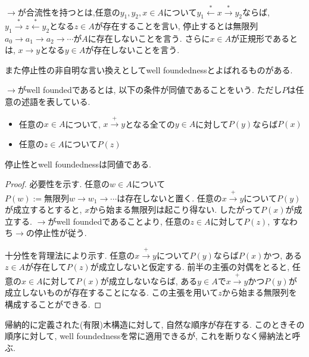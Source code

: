 \documentclass[12pt, titlepage]{ltjsarticle}
\begin{document}
\begin{defn}
$\rightarrow$が合流性を持つとは,任意の$y_{1},y_{2},x \in A$について$y_1 \overset{*}{\leftarrow} x \overset{*}{\rightarrow} y_2$ならば, $y_1 \overset{*}{\rightarrow} z \overset{*}{\leftarrow} y_2$となる$z \in A$が存在することを言い, 停止するとは無限列$a_0 \rightarrow a_1 \rightarrow a_2 \rightarrow \cdots$が$A$に存在しないことを言う. さらに$x \in A$が正規形であるとは, $x \rightarrow y$となる$y \in A$が存在しないことを言う.
\end{defn}

また停止性の非自明な言い換えとしてwell foundednessとよばれるものがある.

\begin{defn}
$\rightarrow$がwell foundedであるとは, 以下の条件が同値であることをいう. ただし$P$は任意の述語を表している.
 \begin{itemize}
  \item 任意の$x \in A$について, $x \xrightarrow{+} y$となる全ての$y \in A$に対して$P(y)$ならば$P(x)$
  \item 任意の$z \in A$について$P(z)$
 \end{itemize}
\end{defn}

\begin{thm}
 停止性とwell foundednessは同値である.
\end{thm}

\begin{proof}
 必要性を示す. 任意の$w \in A$について$P(w):= \text{無限列} w \rightarrow w_1 \rightarrow \cdots \text{は存在しない}$と置く. 任意の$x \xrightarrow{+} y$について$P(y)$が成立するとすると, $x$から始まる無限列は起こり得ない. したがって$P(x)$が成立する. $\rightarrow$がwell foundedであることより, 任意の$z \in A$に対して$P(z)$, すなわち$\rightarrow$の停止性が従う.

 十分性を背理法により示す. 任意の$x \xrightarrow{+} y$について$P(y)$ならば$P(x)$かつ, ある$z \in A$が存在して$P(z)$が成立しないと仮定する. 前半の主張の対偶をとると, 任意の$x \in A$に対して$P(x)$が成立しないならば, ある$y \in A$で$x \xrightarrow{+} y$かつ$P(y)$が成立しないものが存在することになる. この主張を用いて$z$から始まる無限列を構成することができる.
\end{proof}

\begin{rem}
帰納的に定義された(有限)木構造に対して, 自然な順序が存在する.
このときその順序に対して, well foundednessを常に適用できるが, これを断りなく帰納法と呼ぶ.
\end{rem}
\end{document}
